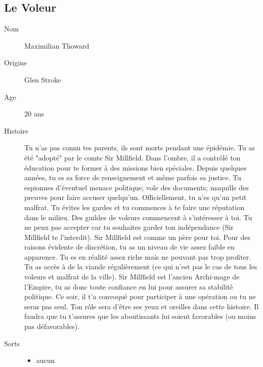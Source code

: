 \documentclass[oneside,12pt]{book}
\begin{document}
\begin{flushleft}
\subsection{Le Voleur}
\begin{description}
\item[Nom]{ Maximilian Thoward}
\item[Origine]{Glen Stroke}
\item[Age]{20 ans}
\item[Histoire]{Tu n'as pas connu tes parents, ils sont morts pendant une épidémie. Tu as été "adopté" par le comte Sir Millfield. Dans l'ombre, il a contrôlé ton éducation pour te former à des missions bien spéciales. Depuis quelques années, tu es sa force de renseignement et même parfois sa justice. Tu espionnes d'éventuel menace politique; vole des documents; maquille des preuves pour faire accuser quelqu'un. Officiellement, tu n'es qu'un petit malfrat. Tu évites les gardes et tu commences à te faire une réputation dans le milieu. Des guildes de voleurs commencent à s'intéresser à toi. Tu ne peux pas accepter car tu souhaites garder ton indépendance (Sir Millfield te l'interdit). 
Sir Millfield est comme un père pour toi. Pour des raisons évidente de discrétion, tu as un niveau de vie assez faible en apparence. Tu es en réalité assez riche mais ne pouvant pas trop profiter. Tu as accès à de la viande régulièrement (ce qui n'est pas le cas de tous les voleurs et malfrat de la ville). Sir Millfield est l'ancien Archi-mage de l'Empire, tu as donc toute confiance en lui pour assurer sa stabilité politique. Ce soir, il t'a convoqué pour participer à une opération ou tu ne seras pas seul. Ton rôle sera d'être ses yeux et oreilles dans cette histoire. Il faudra que tu t'assures que les aboutissants lui soient favorables (ou moins pas défavorables). }
\item[Sorts]{
\begin{itemize}
\item aucun
\end{itemize}
}
\end{description}
\clearpage


\end{flushleft}
\end{document}
